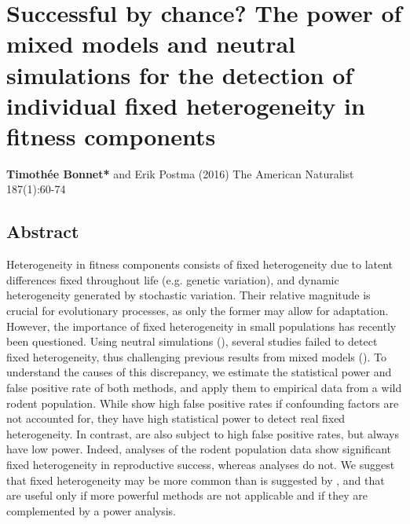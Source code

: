 
\chapter[Chapter 2: Successful by chance? The power of mixed models and neutral simulations for the detection of individual fixed heterogeneity in fitness components]{Successful by chance? The power of mixed models and neutral simulations for the detection of individual fixed heterogeneity in fitness components}

\textbf{Timoth\'{e}e Bonnet*} and Erik Postma (2016) The American Naturalist 187(1):60-74\\

\section{Abstract}
Heterogeneity in fitness components consists of fixed heterogeneity due to latent differences fixed throughout life (e.g. genetic variation), and dynamic heterogeneity generated by stochastic variation. Their relative magnitude is crucial for evolutionary processes, as only the former may allow for adaptation. 
However, the importance of fixed heterogeneity in small populations has recently been questioned. Using neutral simulations (\NSM), several studies failed to detect fixed heterogeneity, thus challenging previous results from mixed models (\MM).
To understand the causes of this discrepancy, we estimate the statistical power and false positive rate of both methods, and apply them to empirical data from a wild rodent population.
    While \MM show high false positive rates if confounding factors are not accounted for, they have high statistical power to detect real fixed heterogeneity. In contrast, \NSM are also subject to high false positive rates, but always have low power. Indeed, \MM analyses of the rodent population data show significant fixed heterogeneity in reproductive success, whereas \NSM analyses do not.
   We suggest that fixed heterogeneity may be more common than is suggested by \NSM, and that \NSM are useful only if more powerful methods are not applicable and if they are complemented by a power analysis.

